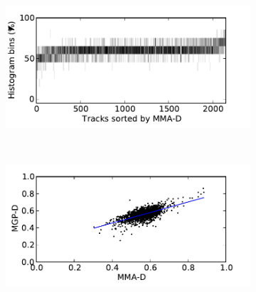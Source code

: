 \documentclass{article}
\begin{document}
\begin{figure}
      \begin{subfigure}[b]{0.25\textwidth}
              \includegraphics[width=\textwidth]{plots/histo-D.pdf}
              \caption{}
              \label{fig:histo-D}
      \end{subfigure}%
      ~ 
      \begin{subfigure}[b]{0.25\textwidth}
              \includegraphics[width=\textwidth]{plots/correl-D.pdf}
              \caption{}
              \label{fig:correl-D}
      \end{subfigure}


\end{figure}
\end{document}
